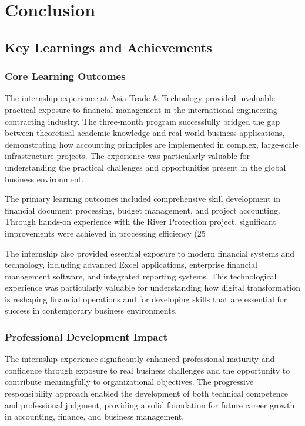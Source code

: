 
\chapter{Conclusion}

\section{Key Learnings and Achievements}

\subsection{Core Learning Outcomes}
The internship experience at Asia Trade \& Technology provided invaluable practical exposure to financial management in the international engineering contracting industry. The three-month program successfully bridged the gap between theoretical academic knowledge and real-world business applications, demonstrating how accounting principles are implemented in complex, large-scale infrastructure projects. The experience was particularly valuable for understanding the practical challenges and opportunities present in the global business environment.

The primary learning outcomes included comprehensive skill development in financial document processing, budget management, and project accounting. Through hands-on experience with the River Protection project, significant improvements were achieved in processing efficiency (25%

The internship also provided essential exposure to modern financial systems and technology, including advanced Excel applications, enterprise financial management software, and integrated reporting systems. This technological experience was particularly valuable for understanding how digital transformation is reshaping financial operations and for developing skills that are essential for success in contemporary business environments.

\subsection{Professional Development Impact}
The internship experience significantly enhanced professional maturity and confidence through exposure to real business challenges and the opportunity to contribute meaningfully to organizational objectives. The progressive responsibility approach enabled the development of both technical competence and professional judgment, providing a solid foundation for future career growth in accounting, finance, and business management.

